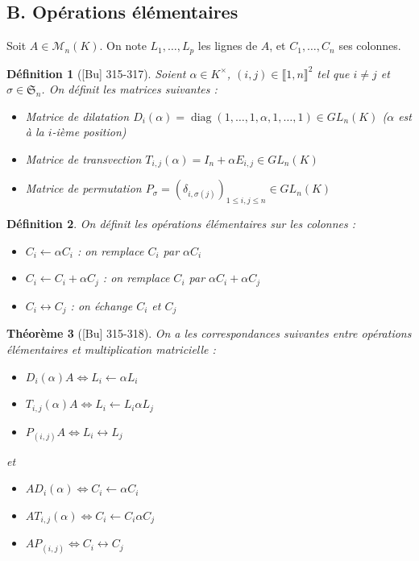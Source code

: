 \documentclass[10pt, a4paper, parskip=full, twoside, twocolumn]{report}
\newtheorem{definition}{Définition}
\newtheorem{theorem}[definition]{Théorème}
\DeclareMathOperator{\diag}{diag}
\begin{document}
\subsection*{B. Opérations élémentaires}
Soit $A\in\mathcal{M}_n(K)$. On note $L_1, \dots, L_p$ les lignes de $A$, et $C_1,\dots,C_n$ ses colonnes.
\begin{definition}[\textnormal{[Bu] 315-317}]
	Soient $\alpha \in K^{\times}$, $(i,j)\in\llbracket 1,n\rrbracket^2$ tel que $i\neq j$ et $\sigma\in\mathfrak{S}_n$. On définit les matrices suivantes :
	\begin{itemize}
		\item Matrice de \emph{dilatation} $D_i(\alpha) = \diag(1,\dots, 1, \alpha,1,\dots, 1)\in GL_n(K)$ ($\alpha$ est à la $i$-ième position)
		\item Matrice de \emph{transvection} $T_{i,j}(\alpha) = I_n + \alpha E_{i,j}\in GL_n(K)$
		\item Matrice de \emph{permutation} $P_{\sigma} = \left(\delta_{i,\sigma(j)}\right)_{1\leq i,j\leq n}\in GL_n(K)$
	\end{itemize}
\end{definition}

\begin{definition}
	On définit les \emph{opérations élémentaires} sur les colonnes :
	\begin{itemize}
		\item $C_i \longleftarrow \alpha C_i$ : on remplace $C_i$ par $\alpha C_i$
		\item $C_i \longleftarrow C_i + \alpha C_j$ : on remplace $C_i$ par $\alpha C_i+\alpha C_j$
		\item $C_i \longleftrightarrow C_j$ : on échange $C_i$ et $C_j$
	\end{itemize}
\end{definition}

\begin{theorem}[\textnormal{[Bu] 315-318}]
	On a les correspondances suivantes entre opérations élémentaires et multiplication matricielle :
	\begin{itemize}
		\item $D_i(\alpha)A\iff L_i \longleftarrow \alpha L_i$
		\item $T_{i,j}(\alpha)A\iff L_i \longleftarrow L_i \alpha L_j$
		\item $P_{(i,j)}A\iff L_i \longleftrightarrow L_j$
	\end{itemize}
	et 
	\begin{itemize}
		\item $A D_i(\alpha)\iff C_i \longleftarrow \alpha C_i$
		\item $AT_{i,j}(\alpha)\iff C_i \longleftarrow C_i \alpha C_j$
		\item $AP_{(i,j)}\iff C_i \longleftrightarrow C_j$
	\end{itemize}
\end{theorem}
\end{document}
